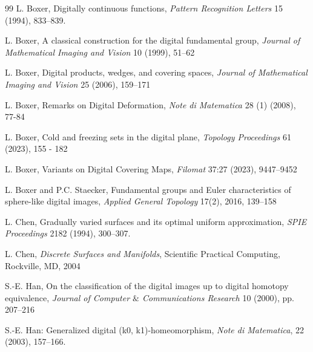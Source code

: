 \documentclass{article} \UseRawInputEncoding
\theoremstyle{plain}
\theoremstyle{definition}
\numberwithin{thm}{section}
\begin{document}
\begin{thebibliography}{99}
L. Boxer,
Digitally continuous functions,
{\em Pattern Recognition Letters} 15 (1994), 833--839.

L. Boxer,
A classical construction for the digital fundamental group,
{\em Journal of Mathematical Imaging and Vision} 10 (1999), 51--62 %

L. Boxer, 
Digital products, wedges, and covering spaces, 
{\em Journal of Mathematical Imaging and Vision} 25 (2006), 159--171

 L. Boxer, Remarks on Digital Deformation, 
 {\em Note di Matematica} 28 (1) (2008), 77-84
 

L. Boxer, 
Cold and freezing sets in the digital plane, 
{\em Topology Proceedings} 61 (2023), 155 - 182

L. Boxer,
Variants on Digital Covering Maps, 
{\em Filomat} 37:27 (2023), 9447--9452 

L. Boxer and P.C. Staecker, Fundamental groups and Euler characteristics of sphere-like 
digital images, 
{\em Applied General Topology}
17(2), 2016, 139--158

L. Chen, Gradually varied surfaces and its optimal 
uniform approximation, 
{\em SPIE Proceedings} 2182 (1994), 300--307. 

L. Chen, {\em Discrete Surfaces and Manifolds}, Scientific Practical Computing, 
Rockville, MD, 2004

S.-E. Han, 
On the classification of the digital images up to digital homotopy equivalence, 
{\em Journal of Computer $\&$ Communications Research}
10 (2000), pp. 207--216

S.-E. Han: Generalized digital (k0, k1)-homeomorphism, 
{\em Note di Matematica}, 22 (2003),
157–166.


\end{thebibliography}
\end{document}
